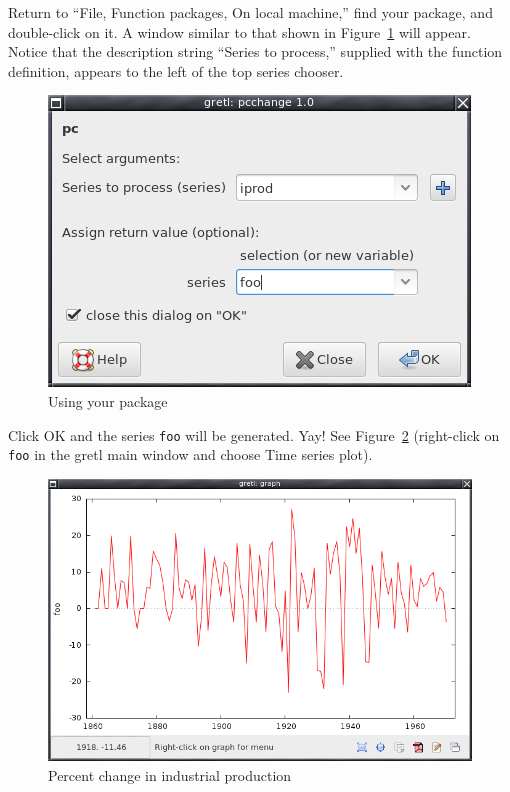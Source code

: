 \documentclass[oneside]{book}
\begin{document}
Return to ``File, Function packages, On local machine,'' find your
package, and double-click on it. A window similar to that shown in
Figure~\ref{fig:function_call} will appear.  Notice that the
description string ``Series to process,'' supplied with the function
definition, appears to the left of the top series chooser.

\begin{figure}[htbp]
  \centering
  \includegraphics[scale=0.5]{figures/function_call}
  \caption{Using your package}
  \label{fig:function_call}
\end{figure}

Click \textsf{OK} and the series \texttt{foo} will be generated. Yay!
See Figure~\ref{fig:iprod_pc} (right-click on \texttt{foo} in the
gretl main window and choose \textsf{Time series plot}).

\begin{figure}[htbp]
  \centering
  \includegraphics[scale=0.6]{figures/iprod_pc}
  \caption{Percent change in industrial production}
  \label{fig:iprod_pc}
\end{figure}
\end{document}
